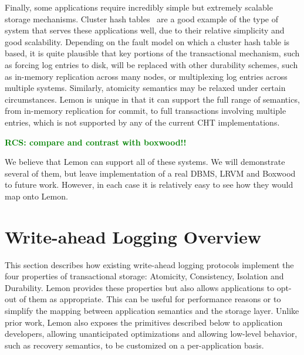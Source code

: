 \documentclass[10pt,letterpaper,twocolumn,english]{article}
\newcommand{\yad}{Lemon\xspace}
\newcommand{\eab}[1]{\textcolor{red}{\bf EAB: #1}}
\newcommand{\rcs}[1]{\textcolor{green}{\bf RCS: #1}}
\begin{document}
Finally, some applications require incredibly simple but extremely
scalable storage mechanisms.  Cluster hash tables~\cite{cht} are a good example
of the type of system that serves these applications well, due to
their relative simplicity and good scalability.  Depending
on the fault model on which a cluster hash table is based, it is
quite plausible that key portions of the transactional mechanism, such
as forcing log entries to disk, will be replaced with other durability
schemes, such as in-memory replication across many nodes, or
multiplexing log entries across multiple systems.  Similarly,
atomicity semantics may be relaxed under certain circumstances.  \yad is unique in that it can support the full range of semantics, from in-memory replication for commit, to full transactions involving multiple entries, which is not supported by any of the current CHT implementations.

\rcs{compare and contrast with boxwood!!}


We believe that \yad can support all of these systems. We will
demonstrate several of them, but leave implementation of a real DBMS,
LRVM and Boxwood to future work.  However, in each case it is
relatively easy to see how they would map onto \yad.





\section{Write-ahead Logging Overview}

This section describes how existing write-ahead logging protocols
implement the four properties of transactional storage: Atomicity,
Consistency, Isolation and Durability.  \yad provides these
properties but also allows applications to opt-out of
them as appropriate.  This can be useful for
performance reasons or to simplify the mapping between application
semantics and the storage layer.  Unlike prior work, \yad also exposes
the primitives described below to application developers, allowing
unanticipated optimizations and allowing low-level
behavior, such as recovery semantics, to be customized on a
per-application basis.
\end{document}
